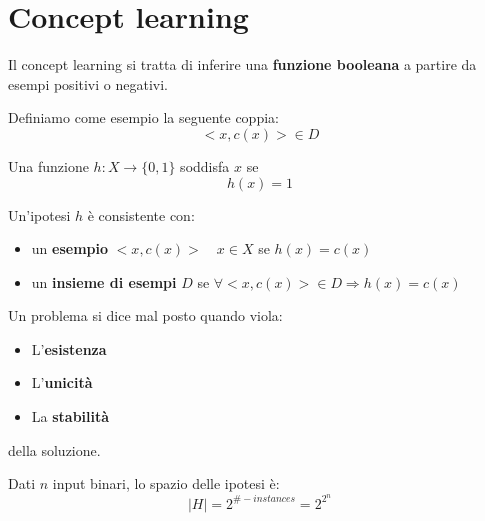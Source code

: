 \newpage
\section{Concept learning}
Il concept learning si tratta di inferire una \textbf{funzione booleana} a partire da esempi positivi o negativi.
\begin{definition}[Esempio]
	Definiamo come esempio la seguente coppia:
	\begin{equation*}
		<x,c(x)> \in D
	\end{equation*}
\end{definition}
\begin{definition}[Soddisfa]
	Una funzione $h:X\to\{0,1\}$ soddisfa $x$ se
	\begin{equation*}
		h(x)=1
	\end{equation*}
\end{definition}
\begin{definition}[Consistenza]
	Un'ipotesi $h$ è consistente con:
	\begin{itemize}
		\item un \textbf{esempio} $<x,c(x)> \quad x \in X$ se $h(x) = c(x)$
		\item un \textbf{insieme di esempi} $D$ se $\forall <x,c(x)> \in D \Longrightarrow h(x) = c(x)$
	\end{itemize}
\end{definition}
\begin{definition}
	Un problema si dice mal posto quando viola:
	\begin{itemize}
		\item L'\textbf{esistenza}
		\item L'\textbf{unicità}
		\item La \textbf{stabilità}
	\end{itemize}
	della soluzione.
\end{definition}
\begin{definition}
	Dati $n$ input binari, lo spazio delle ipotesi è:
	\begin{equation}
		\lvert H \rvert = 2^{\#-instances}=2^{2^n}
	\end{equation}
\end{definition}
